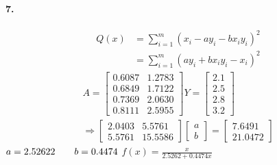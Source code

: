 \documentclass[UTF8]{ctexart}
\begin{document}
	\paragraph{7.}
	\begin{displaymath}
		\begin{aligned}
		Q(x)&=\sum_{i=1}^{m}(x_i-ay_i-bx_iy_i)^2\\
		   &=\sum_{i=1}^{m}(ay_i+bx_iy_i-x_i)^2
		\end{aligned}
	\end{displaymath}
	\begin{displaymath}
	\begin{gathered}
		A=
		\begin{bmatrix}
			0.6087 & 1.2783\\
			0.6849 & 1.7122\\
			0.7369 & 2.0630\\
			0.8111 & 2.5955
		\end{bmatrix}
		Y=
		\begin{bmatrix}
			2.1\\2.5\\2.8\\3.2
		\end{bmatrix}
		\\\Rightarrow
		\begin{bmatrix}
			2.0403 & 5.5761\\
			5.5761 & 15.5586
		\end{bmatrix}
		\begin{bmatrix}
			a\\b
		\end{bmatrix}
		=
		\begin{bmatrix}
			7.6491\\21.0472
		\end{bmatrix}
	\end{gathered}
	\end{displaymath}
	$a=2.52622\qquad b=0.4474\\$
	$f(x)=\frac{x}{2.5262+0.4474x}$
	
\end{document}
